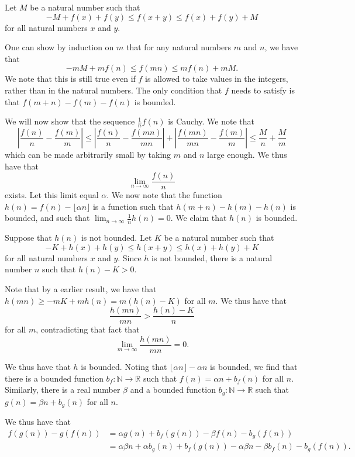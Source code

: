 \documentclass{article}
\begin{document}
\begin{enumerate}[1.]
Let $M$ be a natural number such that
\[
	-M + f(x) + f(y) \leq f(x + y) \leq f(x) + f(y) + M
\]
for all natural numbers $x$ and $y$.

One can show by induction on $m$ that for any natural numbers $m$ and $n$, we have that
\[
	-mM + mf(n) \leq f(mn) \leq mf(n) + mM.
\]
We note that this is still true even if $f$ is allowed to take values in the integers, rather than in the natural numbers. The only condition that $f$ needs to satisfy is that $f(m + n) - f(m) - f(n)$ is bounded.

We will now show that the sequence $\frac{1}{n} f(n)$ is Cauchy. We note that
\[
	\left| \frac{f(n)}{n} - \frac{f(m)}{m} \right| \leq \left| \frac{f(n)}{n} - \frac{f(mn)}{mn} \right| + \left| \frac{f(mn)}{mn} - \frac{f(m)}{m} \right| \leq \frac{M}{n} + \frac{M}{m}
\]
which can be made arbitrarily small by taking $m$ and $n$ large enough. We thus have that
\[
	\lim_{n \to \infty} \frac{f(n)}{n}
\]
exists. Let this limit equal $\alpha$. We now note that the function $h(n) = f(n) - \lfloor \alpha n \rfloor$ is a function such that $h(m + n) - h(m) - h(n)$ is bounded, and such that $\lim_{n \to \infty} \frac{1}{n} h(n) = 0$. We claim that $h(n)$ is bounded.

Suppose that $h(n)$ is not bounded. Let $K$ be a natural number such that
\[
	-K + h(x) + h(y) \leq h(x + y) \leq h(x) + h(y) + K
\]
for all natural numbers $x$ and $y$. Since $h$ is not bounded, there is a natural number $n$ such that $h(n) - K > 0$.

Note that by a earlier result, we have that $h(mn) \geq -mK + mh(n) = m(h(n) - K)$ for all $m$. We thus have that
\[
	\frac{h(mn)}{mn} > \frac{h(n) - K}{n}
\]
for all $m$, contradicting that fact that
\[
	\lim_{m \to \infty} \frac{h(mn)}{mn} = 0.
\]

We thus have that $h$ is bounded. Noting that $\lfloor \alpha n \rfloor - \alpha n$ is bounded, we find that there is a bounded function $b_{f} : \mathbb{N} \to \mathbb{R}$ such that $f(n) = \alpha n + b_{f} (n)$ for all $n$. Similarly, there is a real number $\beta$ and a bounded function $b_{g} : \mathbb{N} \to \mathbb{R}$ such that $g(n) = \beta n + b_{g} (n)$ for all $n$.

We thus have that
\begin{align*}
	f(g(n)) - g(f(n)) &= \alpha g(n) + b_{f} (g(n)) - \beta f(n) - b_{g} (f(n)) \\
	&= \alpha \beta n + \alpha b_{g} (n) + b_{f} (g(n)) - \alpha \beta n - \beta b_{f} (n) - b_{g} (f(n)).
\end{align*}


\end{enumerate}
\end{document}
